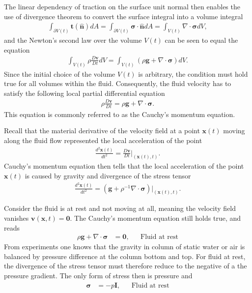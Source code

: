 The linear dependency of traction on the surface unit normal then enables the use of divergence theorem to convert the surface integral into a volume integral
\begin{align}
    \int_{\partial V(t)}\bm{t}(\bm{\hat{n}})dA=\int_{\partial V(t)}\bm{\sigma}\cdot\bm{\hat{n}}dA=\int_{V(t)}\nabla\cdot\bm{\sigma} dV,
\end{align}
and the Newton's second law over the volume $V(t)$ can be seen to equal the equation
\begin{align}
    \int_{V(t)}\rho\frac{D\bm{v}}{Dt}dV=\int_{V(t)}(\rho \bm{g}+\nabla\cdot \bm{\sigma}) dV.
\end{align}
Since the initial choice of the volume $V(t)$ is arbitrary, the condition must hold true for all volumes within the fluid. Consequently, the fluid velocity has to satisfy the following local partial differential equation
\begin{align}\label{eq:cauchy-momentum}
    \rho\frac{D\bm{v}}{Dt}=\rho\bm{g}+\nabla\cdot\bm{\sigma}.
\end{align}
This equation is commonly referred to as the Cauchy's momentum equation. 
\begin{example}
    Recall that the material derivative of the velocity field at a point $\bm{x}(t)$ moving along the fluid flow represented the local acceleration of the point
    \begin{align*}
        \frac{d^2\bm{x}(t)}{dt^2}=\frac{D\bm{v}}{Dt}\Big|_{(\bm{x}(t),t)}.
    \end{align*}
    Cauchy's momentum equation then tells that the local acceleration of the point $\bm{x}(t)$ is caused by gravity and divergence of the stress tensor
    \begin{align*}
        \frac{d^2\bm{x}(t)}{dt^2}=\left(\bm{g}+\rho^{-1}\nabla\cdot\bm{\sigma}\right)\Big|_{(\bm{x}(t),t)}.
    \end{align*}
\end{example}
\begin{example}
    Consider the fluid is at rest and not moving at all, meaning the velocity field vanishes $\bm{v}(\bm{x},t)=\bm{0}$. The Cauchy's momentum equation still holds true, and reads
    \begin{align*}
        \rho\bm{g}+\nabla\cdot\bm{\sigma}&=\bm{0}, && \text{Fluid at rest}
    \end{align*}
    From experiments one knows that the gravity in column of static water or air is balanced by pressure difference at the column bottom and top. For fluid at rest, the divergence of the stress tensor must therefore reduce to the negative of a the pressure gradient. The only form of stress then is pressure and
    \begin{align*}
        \bm{\sigma}&=-p\bm{I}, && \text{Fluid at rest}
    \end{align*}
\end{example}

